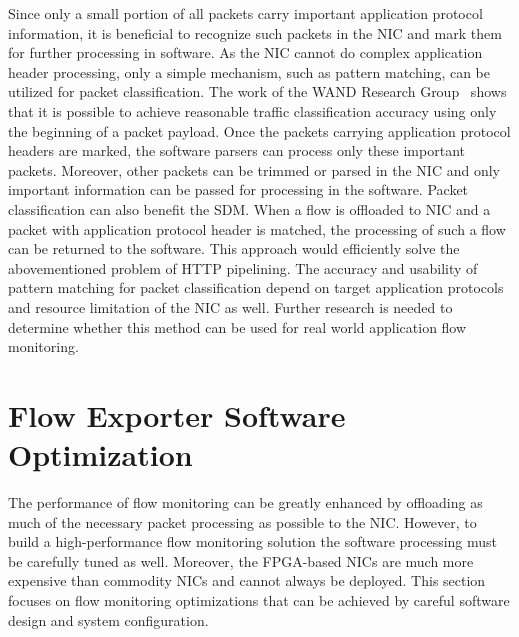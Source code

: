 Since only a small portion of all packets carry important application protocol information, it is beneficial to recognize such packets in the NIC and mark them for further processing in software. As the NIC cannot do complex application header processing, only a simple mechanism, such as pattern matching, can be utilized for packet classification. The work of the WAND Research Group~\cite{Alcock-2012-libprotoident} shows that it is possible to achieve reasonable traffic classification accuracy using only the beginning of a packet payload. Once the packets carrying application protocol headers are marked, the software parsers can process only these important packets. Moreover, other packets can be trimmed or parsed in the NIC and only important information can be passed for processing in the software. Packet classification can also benefit the SDM. When a flow is offloaded to NIC and a packet with application protocol header is matched, the processing of such a flow can be returned to the software. This approach would efficiently solve the abovementioned problem of HTTP pipelining. The accuracy and usability of pattern matching for packet classification depend on target application protocols and resource limitation of the NIC as well. Further research is needed to determine whether this method can be used for real world application flow monitoring.

\section{Flow Exporter Software Optimization}\label{sec:performance-sw-optimization}

The performance of flow monitoring can be greatly enhanced by offloading as much of the necessary packet processing as possible to the NIC. However, to build a high-performance flow monitoring solution the software processing must be carefully tuned as well. Moreover, the FPGA-based NICs are much more expensive than commodity NICs and cannot always be deployed. This section focuses on flow monitoring optimizations that can be achieved by careful software design and system configuration.

